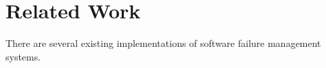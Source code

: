 \documentclass{article}
\begin{document}











\cleardoublepage
\section{Related Work}
There are several existing implementations of software failure
management systems.
\end{document}
